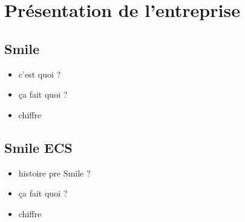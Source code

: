 \section{Présentation de l'entreprise}

\subsection{Smile}
\begin{itemize}
  \item c'est quoi ?
  \item ça fait quoi ?
  \item chiffre
\end{itemize}

\subsection{Smile ECS}
\begin{itemize}
  \item histoire pre Smile ?
  \item ça fait quoi ?
  \item chiffre
\end{itemize}
